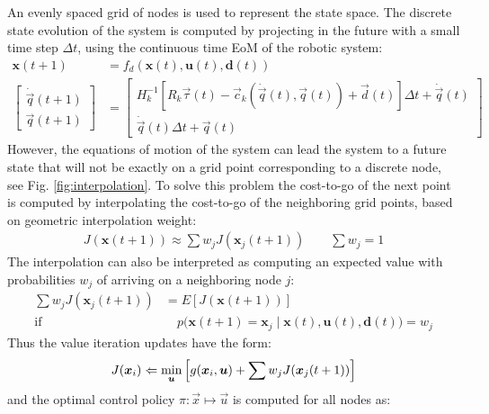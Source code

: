 An evenly spaced grid of nodes is used to represent the state space. The discrete state evolution of the system is computed by projecting in the future with a small time step $\Delta t$, using the continuous time EoM of the robotic system:
%
\begin{align}
\boldsymbol{x}(t+1) &= f_d( \boldsymbol{x}(t) , \boldsymbol{u}(t) , \boldsymbol{d}(t) ) \\
\left[ \begin{array}{c} 
	\dot{\vec{q}}(t+1) \\ \vec{q}(t+1)
\end{array} \right] &= 
\left[ \begin{array}{c} 
	H_k^{-1} \left[ R_k \vec{\tau}(t) - \vec{c}_k( \dot{\vec{q}}(t) , \vec{q}(t))  + \vec{d}(t)  \right] \Delta t + \dot{\vec{q}}(t)  \\ \dot{\vec{q}}(t)  \Delta t + \vec{q}(t) 
\end{array} \right]
\end{align}
%
However, the equations of motion of the system can lead the system to a future state that will not be exactly on a grid point corresponding to a discrete node, see Fig. \ref{fig:interpolation}. To solve this problem the cost-to-go of the next point is computed by interpolating the cost-to-go of the neighboring grid points, based on geometric interpolation weight:
%
\begin{align}
	J(\boldsymbol{x}(t+1)) \approx \sum{ w_j J(\boldsymbol{x}_j(t+1)) }  \quad \quad \sum{ w_j  } = 1
	\label{eq:interpol}
\end{align}
%
The interpolation can also be interpreted as computing an expected value with probabilities $w_j$ of arriving on a neighboring node $j$:
%
\begin{align}
	\sum{ w_j J(\boldsymbol{x}_j(t+1)) }   &= E \left[ J(\boldsymbol{x}(t+1)) \right] \\ 
	\text{if} & \quad
	p \Big(
	\boldsymbol{x}(t+1) = \boldsymbol{x}_j 
	\; \Big| \; 
	\boldsymbol{x}(t) , \boldsymbol{u}(t) , \boldsymbol{d}(t) 
	\Big)  = w_j
	\label{eq:expectation}
\end{align}
%
Thus the value iteration updates have the form:
%
\begin{align}
	J(\boldsymbol{x}_i) \Leftarrow \operatornamewithlimits{min}\limits_{\boldsymbol{u}} 
	\left[ g(\boldsymbol{x}_i,\boldsymbol{u}) + \sum{ w_j J(\boldsymbol{x}_j(t+1))}  \right]
		\label{eq:interpol}
\end{align}
%
and the optimal control policy $\pi:\vec{x}\mapsto\vec{u}$ is computed for all nodes as:
